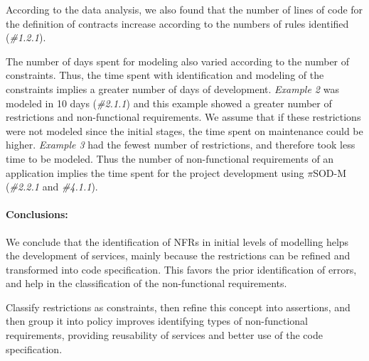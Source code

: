 According to the data analysis, we also found that the number of lines of code
for the definition of contracts increase according to the numbers of rules
identified (\textit{\#1.2.1}). 

The number of days spent for modeling also varied
according to the number of constraints. Thus, the time spent with
identification and modeling of the constraints implies a greater number of days
of development. \textit{Example 2} was modeled in 10 days (\textit{\#2.1.1}) and
this example showed a greater number of restrictions and non-functional
requirements. We assume that if these restrictions were not modeled since the initial stages, the time spent on
maintenance could be higher. \textit{Example 3} had the fewest
number of restrictions, and therefore took less time to be modeled. Thus the
number of non-functional requirements of an application implies the time spent
for the project development using $\pi$SOD-M (\textit{\#2.2.1} and
\textit{\#4.1.1}).


\paragraph{Conclusions:}

We conclude that the identification of NFRs in initial levels of modelling helps
the development of services, mainly because the restrictions can be
refined and transformed into code specification. This favors the
prior identification of errors, and help in the classification of the
non-functional requirements.

Classify restrictions as constraints, then refine this concept into assertions,
and then group it into policy improves identifying types of non-functional
requirements, providing reusability of services and better use of the code
specification.

